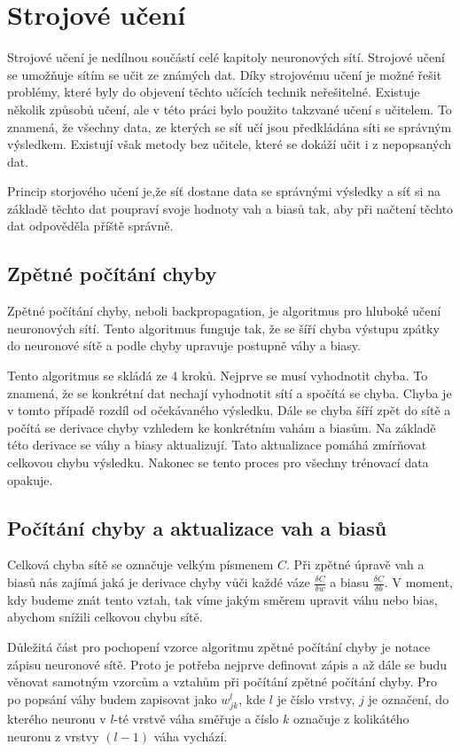 \section{Strojové učení}
Strojové učení je nedílnou součástí celé kapitoly neuronových sítí. Strojové učení se umožňuje sítím se učit ze známých dat.
Díky strojovému učení je možné řešit problémy, které byly do objevení těchto učících technik neřešitelné.
Existuje několik způsobů učení, ale v této práci bylo použito takzvané učení s učitelem.
To znamená, že všechny data, ze kterých se síť učí jsou předkládána síti se správným výsledkem.
Existují však metody bez učitele, které se dokáží učit i z nepopsaných dat.

Princip storjového učení je,že síť dostane data se správnými výsledky a síť si na základě těchto dat poupraví svoje hodnoty vah a biasů tak,
aby při načtení těchto dat odpověděla příště správně.

\subsection{Zpětné počítání chyby}
Zpětné počítání chyby\cite{backpropagation}, neboli backpropagation, je algoritmus pro hluboké učení neuronových sítí.
Tento algoritmus funguje tak, že se šíří chyba výstupu zpátky do neuronové sítě a podle chyby upravuje postupně váhy a biasy.

Tento algoritmus se skládá ze 4 kroků. Nejprve se musí vyhodnotit chyba. To znamená, že se konkrétní dat nechají vyhodnotit sítí a spočítá se chyba.
Chyba je v tomto případě rozdíl od očekávaného výsledku. Dále se chyba šíří zpět do sítě a počítá se derivace chyby vzhledem ke konkrétním vahám a biasům.
Na základě této derivace se váhy a biasy aktualizují. Tato aktualizace pomáhá zmírňovat celkovou chybu výsledku. Nakonec se tento proces pro všechny trénovací data opakuje.

\subsection{Počítání chyby a aktualizace vah a biasů}
Celková chyba sítě se označuje velkým písmenem \(C\). Při zpětné úpravě vah a biasů nás zajímá jaká je derivace chyby vůči každé váze \(\frac{\delta C}{\delta w}\) a biasu \(\frac{\delta C}{\delta b}\).
V moment, kdy budeme znát tento vztah, tak víme jakým směrem upravit váhu nebo bias, abychom snížili celkovou chybu sítě.

Důležitá část pro pochopení vzorce algoritmu zpětné počítání chyby je notace zápisu neuronové sítě.
Proto je potřeba nejprve definovat zápis a až dále se budu věnovat samotným vzorcům a vztahům při počítání zpětné počítání chyby.
Pro po popsání váhy budem zapisovat jako \(w_{jk}^l\), kde \(l\) je číslo vrstvy, \(j\) je označení,
do kterého neuronu v \(l\)-té vrstvě váha směřuje a číslo \(k\) označuje z kolikátého neuronu z vrstvy \((l-1)\) váha vychází.

